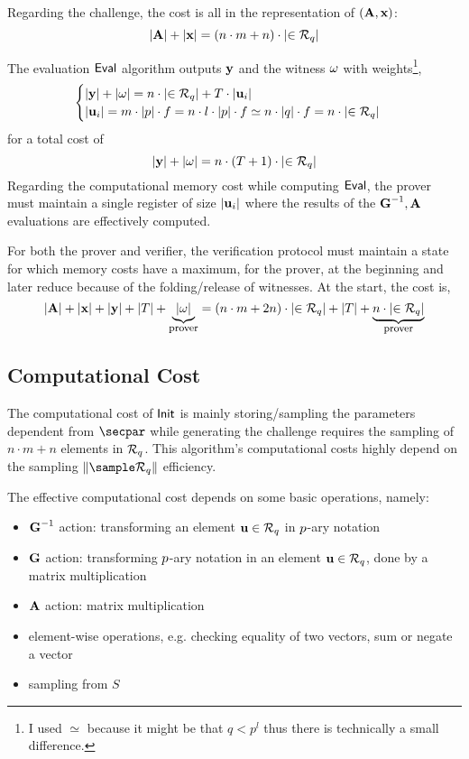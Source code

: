Regarding the challenge, the cost is all in the representation of $(\vA,\vx)$:
\[ \card{\vA} + \card{\vx} = \left( n\cdot m + n \right)\cdot\card{\in\Rring[\qprime]} \]

The evaluation $\textsf{Eval}$ algorithm outputs $\vy$ and the witness $\witness$ with
weights\footnote{I used $\simeq$ because it might be that $q < p^l$ thus
	there is technically a small difference.},
\[
	\begin{cases}
		\card{\vy} + \card{\witness} = n \cdot \card{\in\Rring[\qprime]} + T \cdot \card{\vu[i]}\\
		\card{\vu[i]} = m \cdot \card{\pprime} \cdot f = n \cdot l \cdot \card{\pprime} \cdot f
		\simeq n \cdot \card{\qprime} \cdot f = n \cdot \card{\in \Rring[q]}
	\end{cases}
\]
for a total cost of 
\[ \card{\vy} + \card{\witness} = n \cdot (T+1) \cdot \card{\in\Rring[\qprime]}\]
%
Regarding the computational memory cost while computing $\textsf{Eval}$, the prover must maintain a
single register of size
$\card{\vu[i]}$ where the results of the $\vGi,\vA$ evaluations are effectively computed.

\vspace{2mm}

For both the prover and verifier, the verification protocol must maintain a state for which memory
costs have a maximum, for the prover, at the beginning and later reduce because of the folding/release
of witnesses.
At the start, the cost is,
\[ \card{\vA} + \card{\vx} + \card{\vy} + \card{T} +
	\underbrace{\card{\witness}}_{\text{\footnotesize prover}} =
	\left( n\cdot m + 2n \right)\cdot\card{\in\Rring[\qprime]} + \card{T} 
	+ \underbrace{ n \cdot \card{\in \Rring[q]}}_{\text{\footnotesize prover}}\]



\subsection{Computational Cost}

The computational cost of $\textsf{Init}$ is mainly storing/sampling the parameters dependent from $\secpar$
while generating the challenge requires the sampling of $n\cdot m +n$ elements in $\Rring[\qprime]$.
This algorithm's computational costs highly depend on the sampling $\comp{\sample \Rring[\qprime]}$
efficiency.


The effective computational cost depends on some basic operations, namely:
\begin{itemize}
	\item $\vGi$ action: transforming an element $\vu \in \Rring[q]$ in $p$-ary notation
	\item $\vG$ action: transforming $p$-ary notation in an element $\vu \in \Rring[q]$,
		done by a matrix multiplication
	\item $\vA$ action: matrix multiplication
	\item element-wise operations, e.g. checking equality of two vectors, sum or negate a vector
	\item sampling from $S$
\end{itemize}

